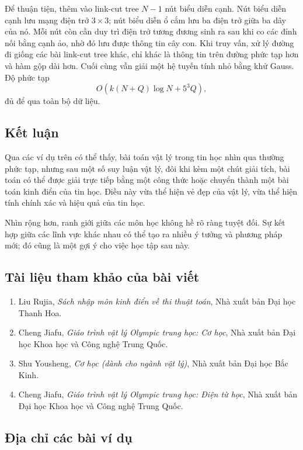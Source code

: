 \documentclass[11pt]{article}
\begin{document}
Để thuận tiện, thêm vào link-cut tree \(N-1\) nút biểu diễn cạnh. Nút biểu diễn
cạnh lưu mạng điện trở \(3\times 3\); nút biểu diễn ổ cắm lưu ba điện trở giữa
ba dây của nó. Mỗi nút còn cần duy trì điện trở tương đương sinh ra sau khi co
các đỉnh nối bằng cạnh ảo, nhờ đó lưu được thông tin cây con. Khi truy vấn, xử
lý đường đi giống các bài link-cut tree khác, chỉ khác là thông tin trên đường
phức tạp hơn và hàm gộp dài hơn. Cuối cùng vẫn giải một hệ tuyến tính nhỏ bằng
khử Gauss. Độ phức tạp
\[
  O(k(N+Q)\log N+5^3Q),
\]
đủ để qua toàn bộ dữ liệu.

\subsection{Kết luận}

Qua các ví dụ trên có thể thấy, bài toán vật lý trong tin học nhìn qua thường
phức tạp, nhưng sau một số suy luận vật lý, đôi khi kèm một chút giải tích, bài
toán có thể được giải trực tiếp bằng một công thức hoặc chuyển thành một bài
toán kinh điển của tin học. Điều này vừa thể hiện vẻ đẹp của vật lý, vừa thể
hiện tính chính xác và hiệu quả của tin học.

Nhìn rộng hơn, ranh giới giữa các môn học không hề rõ ràng tuyệt đối. Sự kết
hợp giữa các lĩnh vực khác nhau có thể tạo ra nhiều ý tưởng và phương pháp mới;
đó cũng là một gợi ý cho việc học tập sau này.

\subsection*{Tài liệu tham khảo của bài viết}

\begin{enumerate}
  \item Liu Rujia, \emph{Sách nhập môn kinh điển về thi thuật toán}, Nhà xuất
  bản Đại học Thanh Hoa.
  \item Cheng Jiafu, \emph{Giáo trình vật lý Olympic trung học: Cơ học}, Nhà
  xuất bản Đại học Khoa học và Công nghệ Trung Quốc.
  \item Shu Yousheng, \emph{Cơ học (dành cho ngành vật lý)}, Nhà xuất bản Đại
  học Bắc Kinh.
  \item Cheng Jiafu, \emph{Giáo trình vật lý Olympic trung học: Điện từ học},
  Nhà xuất bản Đại học Khoa học và Công nghệ Trung Quốc.
\end{enumerate}

\subsection*{Địa chỉ các bài ví dụ}
\end{document}
